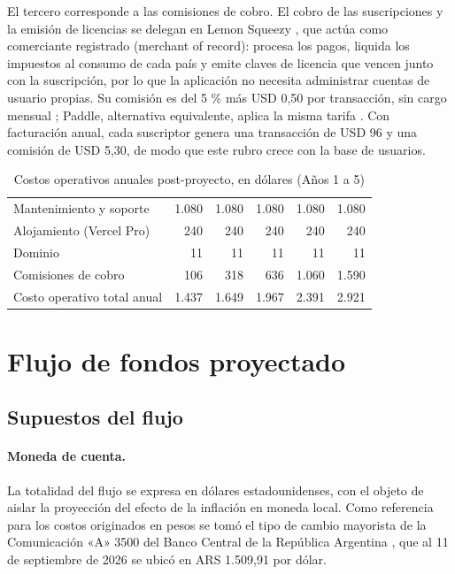 El tercero corresponde a las comisiones de cobro. El cobro de las suscripciones y la emisión de licencias se delegan en Lemon Squeezy \citep{lemonlicense}, que actúa como comerciante registrado (merchant of record): procesa los pagos, liquida los impuestos al consumo de cada país y emite claves de licencia que vencen junto con la suscripción, por lo que la aplicación no necesita administrar cuentas de usuario propias. Su comisión es del 5 \% más USD 0,50 por transacción, sin cargo mensual \citep{lemonpricing}; Paddle, alternativa equivalente, aplica la misma tarifa \citep{paddlepricing}. Con facturación anual, cada suscriptor genera una transacción de USD 96 y una comisión de USD 5,30, de modo que este rubro crece con la base de usuarios.

\begin{table}[H]
    \centering
    \caption{Costos operativos anuales post-proyecto, en dólares (Años 1 a 5)}
    \label{tab:costos-operativos}
    \small
    \begin{tabularx}{\textwidth}{L r r r r r}
        \toprule
         &  &  &  &  &  \\
        \midrule
        Mantenimiento y soporte & 1.080 & 1.080 & 1.080 & 1.080 & 1.080 \\
        Alojamiento (Vercel Pro) & 240 & 240 & 240 & 240 & 240 \\
        Dominio & 11 & 11 & 11 & 11 & 11 \\
        Comisiones de cobro & 106 & 318 & 636 & 1.060 & 1.590 \\
        Costo operativo total anual & 1.437 & 1.649 & 1.967 & 2.391 & 2.921 \\
        \bottomrule
    \end{tabularx}
\end{table}

\section{Flujo de fondos proyectado}\label{sec:n5.4}

\subsection{Supuestos del flujo}\label{sec:n5.4.1}

\paragraph{Moneda de cuenta.} La totalidad del flujo se expresa en dólares estadounidenses, con el objeto de aislar la proyección del efecto de la inflación en moneda local. Como referencia para los costos originados en pesos se tomó el tipo de cambio mayorista de la Comunicación «A» 3500 del Banco Central de la República Argentina \citep{bcraa3500}, que al 11 de septiembre de 2026 se ubicó en ARS 1.509,91 por dólar.

